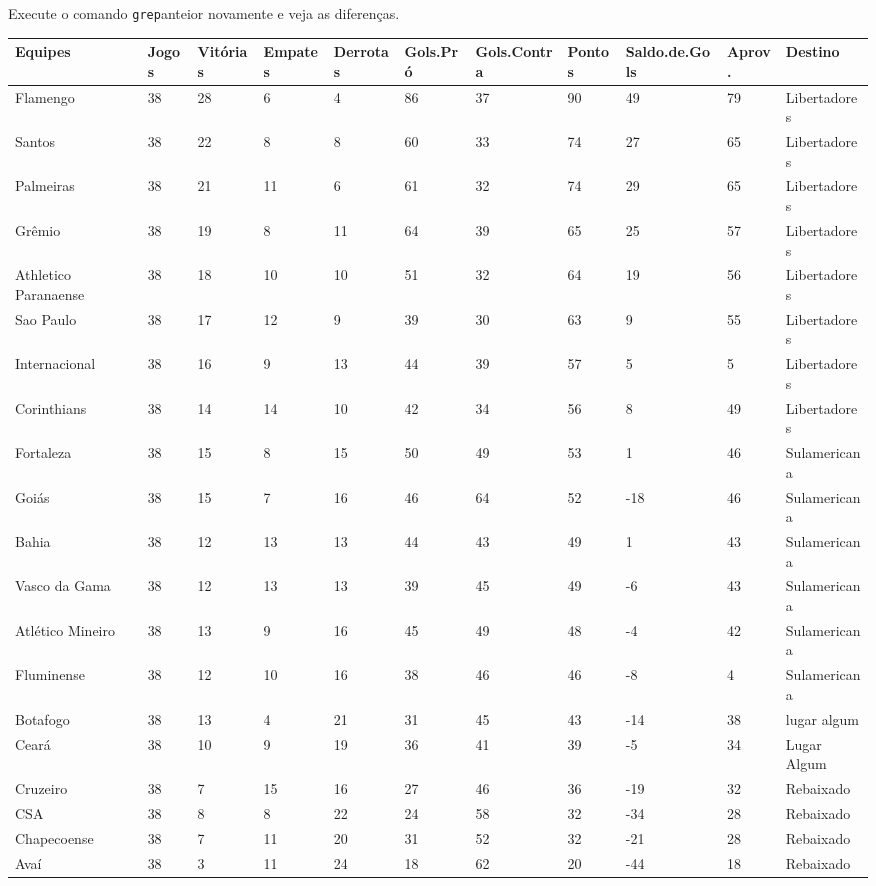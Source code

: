 \documentclass[
]{book}
\newenvironment{Shaded}{\begin{snugshade}}{\end{snugshade}}
\newcommand{\CommentTok}[1]{\textcolor[rgb]{0.56,0.35,0.01}{\textit{#1}}}
\newcommand{\DecValTok}[1]{\textcolor[rgb]{0.00,0.00,0.81}{#1}}
\newcommand{\FloatTok}[1]{\textcolor[rgb]{0.00,0.00,0.81}{#1}}
\newcommand{\NormalTok}[1]{#1}
\newcommand{\OtherTok}[1]{\textcolor[rgb]{0.56,0.35,0.01}{#1}}
\newcommand{\SpecialCharTok}[1]{\textcolor[rgb]{0.00,0.00,0.00}{#1}}
\newcommand{\StringTok}[1]{\textcolor[rgb]{0.31,0.60,0.02}{#1}}
\begin{document}
\begin{Shaded}
\end{Shaded}

Execute o comando \texttt{grep}anteior novamente e veja as diferenças.

\begin{tabular}{l|l|l|l|l|l|l|l|l|l|l}
\hline
Equipes & Jogos & Vitórias & Empates & Derrotas & Gols.Pró & Gols.Contra & Pontos & Saldo.de.Gols & Aprov. & Destino\\
\hline
Flamengo & 38 & 28 & 6 & 4 & 86 & 37 & 90 & 49 & 79 & Libertadores\\
\hline
Santos & 38 & 22 & 8 & 8 & 60 & 33 & 74 & 27 & 65 & Libertadores\\
\hline
Palmeiras & 38 & 21 & 11 & 6 & 61 & 32 & 74 & 29 & 65 & Libertadores\\
\hline
Grêmio & 38 & 19 & 8 & 11 & 64 & 39 & 65 & 25 & 57 & Libertadores\\
\hline
Athletico Paranaense & 38 & 18 & 10 & 10 & 51 & 32 & 64 & 19 & 56 & Libertadores\\
\hline
Sao Paulo & 38 & 17 & 12 & 9 & 39 & 30 & 63 & 9 & 55 & Libertadores\\
\hline
Internacional & 38 & 16 & 9 & 13 & 44 & 39 & 57 & 5 & 5 & Libertadores\\
\hline
Corinthians & 38 & 14 & 14 & 10 & 42 & 34 & 56 & 8 & 49 & Libertadores\\
\hline
Fortaleza & 38 & 15 & 8 & 15 & 50 & 49 & 53 & 1 & 46 & Sulamericana\\
\hline
Goiás & 38 & 15 & 7 & 16 & 46 & 64 & 52 & -18 & 46 & Sulamericana\\
\hline
Bahia & 38 & 12 & 13 & 13 & 44 & 43 & 49 & 1 & 43 & Sulamericana\\
\hline
Vasco da Gama & 38 & 12 & 13 & 13 & 39 & 45 & 49 & -6 & 43 & Sulamericana\\
\hline
Atlético Mineiro & 38 & 13 & 9 & 16 & 45 & 49 & 48 & -4 & 42 & Sulamericana\\
\hline
Fluminense & 38 & 12 & 10 & 16 & 38 & 46 & 46 & -8 & 4 & Sulamericana\\
\hline
Botafogo & 38 & 13 & 4 & 21 & 31 & 45 & 43 & -14 & 38 & lugar algum\\
\hline
Ceará & 38 & 10 & 9 & 19 & 36 & 41 & 39 & -5 & 34 & Lugar Algum\\
\hline
Cruzeiro & 38 & 7 & 15 & 16 & 27 & 46 & 36 & -19 & 32 & Rebaixado\\
\hline
CSA & 38 & 8 & 8 & 22 & 24 & 58 & 32 & -34 & 28 & Rebaixado\\
\hline
Chapecoense & 38 & 7 & 11 & 20 & 31 & 52 & 32 & -21 & 28 & Rebaixado\\
\hline
Avaí & 38 & 3 & 11 & 24 & 18 & 62 & 20 & -44 & 18 & Rebaixado\\
\hline
\end{tabular}
\end{document}

